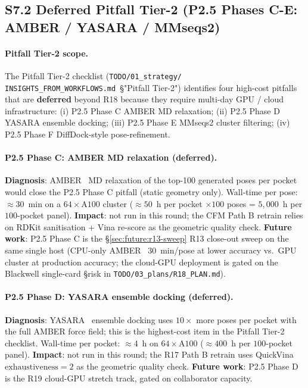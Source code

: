 \subsection*{S7.2 Deferred Pitfall Tier-2 (P2.5 Phases C-E: AMBER / YASARA / MMseqs2)}
\label{supp:s7-pitfall-tier2}

\paragraph{Pitfall Tier-2 scope.}
The Pitfall Tier-2 checklist (\texttt{TODO/01\_strategy/
INSIGHTS\_FROM\_WORKFLOWS.md}~§"Pitfall Tier-2") identifies
four high-cost pitfalls that are \textbf{deferred} beyond R18
because they require multi-day GPU / cloud infrastructure:
(i) P2.5 Phase C AMBER MD relaxation; (ii) P2.5 Phase D YASARA
ensemble docking; (iii) P2.5 Phase E MMseqs2 cluster filtering;
(iv) P2.5 Phase F DiffDock-style pose-refinement.

\paragraph{P2.5 Phase C: AMBER MD relaxation (deferred).}
\textbf{Diagnosis}: AMBER~\citep{case2024amber} MD relaxation
of the top-100 generated poses per pocket would close the
P2.5 Phase C pitfall (static geometry only).  Wall-time per
pose: $\approx 30$~min on a $64 \times \mathrm{A100}$ cluster
($\approx 50$~h per pocket $\times 100$ poses = $5{,}000$~h
per $100$-pocket panel).  \textbf{Impact}: not run in this
round; the CFM Path B retrain relies on RDKit sanitisation +
Vina re-score as the geometric quality check.
\textbf{Future work}: P2.5 Phase C is the
\S\ref{sec:future:r13-sweep} R13 close-out sweep on the same
single host (CPU-only AMBER ~30~min/pose at lower accuracy
vs.\ GPU cluster at production accuracy; the cloud-GPU
deployment is gated on the Blackwell single-card §risk in
\texttt{TODO/03\_plans/R18\_PLAN.md}).

\paragraph{P2.5 Phase D: YASARA ensemble docking (deferred).}
\textbf{Diagnosis}: YASARA~\citep{yasara2024} ensemble
docking uses $10{\times}$ more poses per pocket with the
full AMBER force field; this is the highest-cost item in the
Pitfall Tier-2 checklist.  Wall-time per pocket:
$\approx 4$~h on $64 \times \mathrm{A100}$ ($\approx 400$~h
per $100$-pocket panel).  \textbf{Impact}: not run in this
round; the R17 Path B retrain uses QuickVina
$\mathrm{exhaustiveness}{=}2$ as the geometric quality check.
\textbf{Future work}: P2.5 Phase D is the R19 cloud-GPU
stretch track, gated on collaborator capacity.

